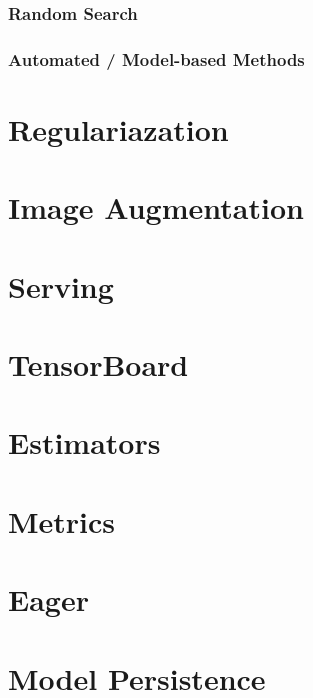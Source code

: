 \subsubsection{Random Search}

\subsubsection{Automated / Model-based Methods}


\section{Regulariazation}

\section{Image Augmentation}

\section{Serving}

\section{TensorBoard}

\section{Estimators}

\section{Metrics}

\section{Eager}

\section{Model Persistence}

